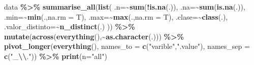 \documentclass[
]{article}
\newenvironment{Shaded}{\begin{snugshade}}{\end{snugshade}}
\newcommand{\AttributeTok}[1]{\textcolor[rgb]{0.13,0.29,0.53}{#1}}
\newcommand{\FunctionTok}[1]{\textcolor[rgb]{0.13,0.29,0.53}{\textbf{#1}}}
\newcommand{\NormalTok}[1]{#1}
\newcommand{\SpecialCharTok}[1]{\textcolor[rgb]{0.81,0.36,0.00}{\textbf{#1}}}
\newcommand{\StringTok}[1]{\textcolor[rgb]{0.31,0.60,0.02}{#1}}
\begin{document}
\begin{Shaded}
\begin{Highlighting}[]
\NormalTok{data }\SpecialCharTok{\%\textgreater{}\%} 
        \FunctionTok{summarise\_all}\NormalTok{(}\FunctionTok{list}\NormalTok{(}
                \AttributeTok{.n=}\SpecialCharTok{\textasciitilde{}}\FunctionTok{sum}\NormalTok{(}\SpecialCharTok{!}\FunctionTok{is.na}\NormalTok{(.)),}
                \AttributeTok{.na=}\SpecialCharTok{\textasciitilde{}}\FunctionTok{sum}\NormalTok{(}\FunctionTok{is.na}\NormalTok{(.)),}
                \AttributeTok{.min=}\SpecialCharTok{\textasciitilde{}}\FunctionTok{min}\NormalTok{(.,}\AttributeTok{na.rm =}\NormalTok{ T),}
                \AttributeTok{.max=}\SpecialCharTok{\textasciitilde{}}\FunctionTok{max}\NormalTok{(.,}\AttributeTok{na.rm =}\NormalTok{ T),}
                \AttributeTok{.clase=}\SpecialCharTok{\textasciitilde{}}\FunctionTok{class}\NormalTok{(.),}
                \AttributeTok{.valor\_distinto=}\SpecialCharTok{\textasciitilde{}}\FunctionTok{n\_distinct}\NormalTok{(.)}
\NormalTok{        )) }\SpecialCharTok{\%\textgreater{}\%} \FunctionTok{mutate}\NormalTok{(}\FunctionTok{across}\NormalTok{(}\FunctionTok{everything}\NormalTok{(),}\SpecialCharTok{\textasciitilde{}}\FunctionTok{as.character}\NormalTok{(.))) }\SpecialCharTok{\%\textgreater{}\%} 
        \FunctionTok{pivot\_longer}\NormalTok{(}\FunctionTok{everything}\NormalTok{(),}
                     \AttributeTok{names\_to =} \FunctionTok{c}\NormalTok{(}\StringTok{"varible"}\NormalTok{,}\StringTok{".value"}\NormalTok{),}
                     \AttributeTok{names\_sep =} \FunctionTok{c}\NormalTok{(}\StringTok{"\_}\SpecialCharTok{\textbackslash{}\textbackslash{}}\StringTok{."}\NormalTok{)) }\SpecialCharTok{\%\textgreater{}\%} 
        \FunctionTok{print}\NormalTok{(}\AttributeTok{n=}\StringTok{"all"}\NormalTok{)}
\end{Highlighting}
\end{Shaded}
\end{document}
